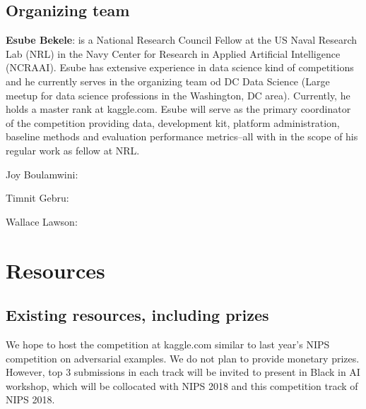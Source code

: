 \documentclass[11pt, oneside]{article}
\begin{document}
\subsection{Organizing team}

{\bf Esube Bekele}: is a National Research Council Fellow at the US Naval Research Lab (NRL) in the Navy Center for Research in Applied Artificial Intelligence (NCRAAI). Esube has extensive experience in data science kind of competitions and he currently serves in the organizing team od DC Data Science (Large meetup for data science professions in the Washington, DC area). Currently, he holds a master rank at kaggle.com. Esube will serve as the primary coordinator of the competition providing data, development kit, platform administration, baseline methods and evaluation performance metrics--all with in the scope of his regular work as fellow at NRL.

{Joy Boulamwini}: 

{Timnit Gebru}:

{Wallace Lawson}:



\section{Resources}
\subsection{Existing resources, including prizes}

We hope to host the competition at kaggle.com similar to last year's NIPS competition on adversarial examples. We do not plan to provide monetary prizes. However, top 3 submissions in each track will be invited to present in Black in AI workshop, which will be collocated with NIPS 2018 and this competition track of NIPS 2018.



%

\end{document}
